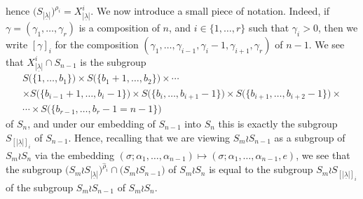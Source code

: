 \documentclass[ALCO,Unicode,published]{cedram}
\newcommand{\ul}[1]{\underline{#1}}
\begin{document}
hence $\bigl(S_{|\ul{\lambda}|}\bigr)^{\rho_i} = X^i_{|\ul{\lambda}|}$.
We now introduce a small piece of notation.
Indeed, if $\gamma = (\gamma_1,\ldots,\gamma_r)$ is a composition of $n$, and $i \in \{1,\ldots,r\}$ such that $\gamma_i > 0$, then we
write $[\gamma]_i$ for the composition $(\gamma_1,\ldots,\gamma_{i-1},\gamma_i -1, \gamma_{i+1},\gamma_r)$ of $n-1$.
We see that $X^i_{|\ul{\lambda}|}\cap S_{n-1}$ is the subgroup
\begin{multline*}
S\bigl(\{1,\ldots,b_1\}\bigr) \times S\bigl(\{b_1+1,\ldots,b_2\}\bigr) \times \cdots\\
\times S\bigl(\{b_{i-1}+1,\ldots,b_i-1\}\bigr)\times S\bigl(\{b_i,\ldots,b_{i+1}-1\}\bigr)\times S\bigl(\{b_{i+1},\ldots,b_{i+2}-1\}\bigr)
\times\\
\cdots \times S\bigl(\{b_{r-1},\ldots,b_r-1 =n-1\}\bigr)
\end{multline*}
of $S_n$, and under our embedding of $S_{n-1}$ into $S_n$
this is exactly the subgroup $S_{[|\ul{\lambda}|]_i}$ of $S_{n-1}$.
Hence, recalling that we are viewing $S_m \wr S_{n-1}$ as a subgroup
of $S_m \wr S_n$ via the embedding $(\sigma;\alpha_1,\ldots,\alpha_{n-1}) \longmapsto (\sigma;\alpha_1,\ldots,\alpha_{n-1},e)$, we see that
the subgroup $\bigl(S_m \wr S_{|\ul{\lambda}|}\bigr)^{\hat\rho_i}\cap\bigl(S_m \wr S_{n-1}\bigr)$ of $S_m \wr S_n$ is equal to the subgroup
$S_m \wr S_{[|\ul{\lambda}|]_i}$ of the subgroup $S_m \wr S_{n-1}$ of $S_m \wr S_n$.
\end{document}
